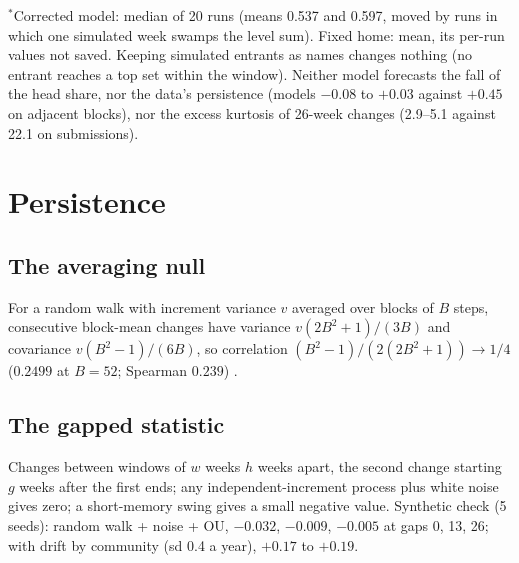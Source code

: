 \documentclass[10pt]{article}
\begin{document}
$^\ast$Corrected model: median of 20 runs (means 0.537 and 0.597, moved by runs in which one simulated week swamps the level sum). Fixed home: mean, its per-run values not saved.
Keeping simulated entrants as names changes nothing (no entrant reaches a top set within the window). Neither model forecasts the fall of the head share, nor the data's persistence (models $-0.08$ to $+0.03$ against $+0.45$ on adjacent blocks), nor the excess kurtosis of 26-week changes (2.9--5.1 against 22.1 on submissions).

\section{Persistence}
\subsection{The averaging null}
For a random walk with increment variance $v$ averaged over blocks of $B$ steps, consecutive block-mean changes have variance $v(2B^2+1)/(3B)$ and covariance $v(B^2-1)/(6B)$, so correlation $(B^2-1)/(2(2B^2+1)) \to 1/4$ ($0.2499$ at $B=52$; Spearman $0.239$) \cite{working1960}.
\subsection{The gapped statistic}
Changes between windows of $w$ weeks $h$ weeks apart, the second change starting $g$ weeks after the first ends; any independent-increment process plus white noise gives zero; a short-memory swing gives a small negative value. Synthetic check (5 seeds): random walk + noise + OU, $-0.032$, $-0.009$, $-0.005$ at gaps 0, 13, 26; with drift by community (sd 0.4 a year), $+0.17$ to $+0.19$.
\end{document}
